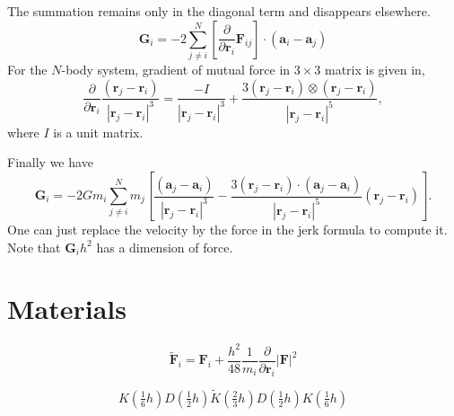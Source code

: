 \documentclass[11pt]{jsarticle}
\begin{document}
The summation remains only in the diagonal term and disappears elsewhere.
\begin{equation}
\bm G_i = -2 \sum_{j \neq i}^N \left[ \frac{\partial}{\partial \bm r_i} \bm F_{ij} \right] \cdot \left(\bm a_i - \bm a_j\right)
\end{equation}
For the $N$-body system, gradient of mutual force in $3 \times 3$ matrix is given in,
\begin{equation}
\frac{\partial}{\partial \bm r_i} \frac{(\bm r_j - \bm r_i)}{| \bm r_j - \bm r_i |^3}
=
\frac{-I}{| \bm r_j - \bm r_i |^3}
+
\frac{3 (\bm r_j - \bm r_i) \otimes (\bm r_j - \bm r_i)}{| \bm r_j - \bm r_i |^5},
\end{equation}
where $I$ is a unit matrix.

Finally we have
\begin{equation}
\bm G_i = -2 G m_i \sum_{j \neq i}^N 
  m_j \left[ \frac{(\bm a_j - \bm a_i)}{| \bm r_j - \bm r_i |^3} - \frac{3 (\bm r_j - \bm r_i) \cdot (\bm a_j - \bm a_i)}{| \bm r_j - \bm r_i |^5} (\bm r_j - \bm r_i) \right].
\end{equation}
One can just replace the velocity by the force in the jerk formula to compute it.
Note that $\bm G_i h^2$ has a dimension of force.

\section{Materials}
\[
\tilde{ \bm F}_i = \bm F_i + \frac{h^2}{48} \frac{1}{m_i} \frac{\partial}{\partial \bm r_i} \left| \bm F \right|^2
\]

\[
	K(\tfrac16 h) D(\tfrac12 h) \tilde K(\tfrac23 h) D(\tfrac12 h) K(\tfrac16 h)
\]
\end{document}
